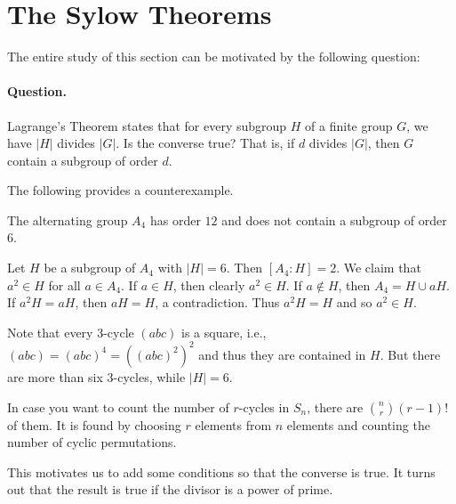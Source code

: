 \section{The Sylow Theorems}
The entire study of this section can be motivated by the following question:
\paragraph{Question.} Lagrange's Theorem states that for every subgroup $H$ of a finite group $G$, we have $|H|$ divides $|G|$. Is the converse true? That is, if $d$ divides $|G|$, then  $G$ contain a subgroup of order $d$.\bigskip

The following provides a counterexample.
\begin{proposition}
	The alternating group $A_4$ has order $12$ and does not contain a subgroup of order $6$.
\end{proposition}
\begin{sketch}
	Let $H$ be a subgroup of $A_4$ with $|H| = 6$. Then $[A_4:H] = 2$.  We claim that $a^2\in H$ for all $a\in A_4$. If $a\in H$, then clearly $a^2\in H$. If $a\not\in H$, then $A_4 = H\cup aH$.  If $a^2H = aH$, then  $aH = H$, a
	contradiction. Thus $a^2H = H$ and so $a^2\in H$.
	
	Note that every $3$-cycle $(abc)$ is a square, i.e., $(abc) = (abc)^4 = ((abc)^2)^2$ and thus they are contained in $H$. But there are more than six $3$-cycles, while $|H| = 6$.
\end{sketch}
\begin{remark}
	In case you want to count the number of $r$-cycles in $S_n$, there are $\binom{n}{r}(r-1)!$ of them. It is found by choosing $r$ elements from $n$ elements and counting the number of cyclic permutations.
	\end{remark}

This motivates us to add some conditions so that the converse is true. It turns out that the result is true if the divisor is a power of prime.

